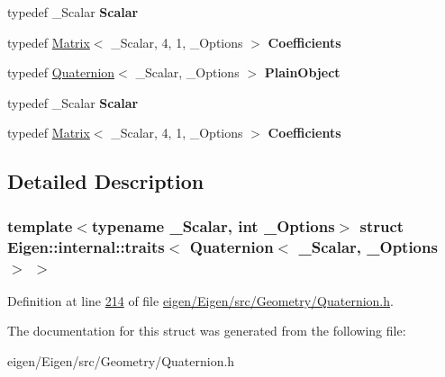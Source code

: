 \begin{DoxyCompactItemize}
typedef \+\_\+\+Scalar {\bfseries Scalar}
\item 
\mbox{\label{struct_eigen_1_1internal_1_1traits_3_01_quaternion_3_01___scalar_00_01___options_01_4_01_4_aa514803b2bece105b57a80070738a308}} 
typedef \hyperlink{group___core___module_class_eigen_1_1_matrix}{Matrix}$<$ \+\_\+\+Scalar, 4, 1, \+\_\+\+Options $>$ {\bfseries Coefficients}
\item 
\mbox{\label{struct_eigen_1_1internal_1_1traits_3_01_quaternion_3_01___scalar_00_01___options_01_4_01_4_aa4df82695cfa29ce9a7e9beab75dc1bf}} 
typedef \hyperlink{group___geometry___module_class_eigen_1_1_quaternion}{Quaternion}$<$ \+\_\+\+Scalar, \+\_\+\+Options $>$ {\bfseries Plain\+Object}
\item 
\mbox{\label{struct_eigen_1_1internal_1_1traits_3_01_quaternion_3_01___scalar_00_01___options_01_4_01_4_ae08389cd2248d4a2c189cdf99f912b41}} 
typedef \+\_\+\+Scalar {\bfseries Scalar}
\item 
\mbox{\label{struct_eigen_1_1internal_1_1traits_3_01_quaternion_3_01___scalar_00_01___options_01_4_01_4_aa514803b2bece105b57a80070738a308}} 
typedef \hyperlink{group___core___module_class_eigen_1_1_matrix}{Matrix}$<$ \+\_\+\+Scalar, 4, 1, \+\_\+\+Options $>$ {\bfseries Coefficients}
\end{DoxyCompactItemize}


\subsection{Detailed Description}
\subsubsection*{template$<$typename \+\_\+\+Scalar, int \+\_\+\+Options$>$\newline
struct Eigen\+::internal\+::traits$<$ Quaternion$<$ \+\_\+\+Scalar, \+\_\+\+Options $>$ $>$}



Definition at line \hyperlink{eigen_2_eigen_2src_2_geometry_2_quaternion_8h_source_l00214}{214} of file \hyperlink{eigen_2_eigen_2src_2_geometry_2_quaternion_8h_source}{eigen/\+Eigen/src/\+Geometry/\+Quaternion.\+h}.



The documentation for this struct was generated from the following file\+:\begin{DoxyCompactItemize}
\item 
eigen/\+Eigen/src/\+Geometry/\+Quaternion.\+h\end{DoxyCompactItemize}
